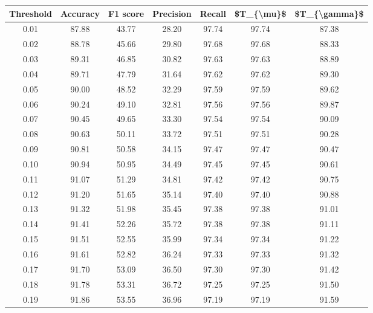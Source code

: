 \begin{tabular}{|c|c|c|c|c|c|c|}
\hline
 Threshold &  Accuracy &  F1 score &  Precision &  Recall &  \$T\_\{\textbackslash mu\}\$ &  \$T\_\{\textbackslash gamma\}\$ \\
\hline
      0.01 &     87.88 &     43.77 &      28.20 &   97.74 &      97.74 &         87.38 \\
      0.02 &     88.78 &     45.66 &      29.80 &   97.68 &      97.68 &         88.33 \\
      0.03 &     89.31 &     46.85 &      30.82 &   97.63 &      97.63 &         88.89 \\
      0.04 &     89.71 &     47.79 &      31.64 &   97.62 &      97.62 &         89.30 \\
      0.05 &     90.00 &     48.52 &      32.29 &   97.59 &      97.59 &         89.62 \\
      0.06 &     90.24 &     49.10 &      32.81 &   97.56 &      97.56 &         89.87 \\
      0.07 &     90.45 &     49.65 &      33.30 &   97.54 &      97.54 &         90.09 \\
      0.08 &     90.63 &     50.11 &      33.72 &   97.51 &      97.51 &         90.28 \\
      0.09 &     90.81 &     50.58 &      34.15 &   97.47 &      97.47 &         90.47 \\
      0.10 &     90.94 &     50.95 &      34.49 &   97.45 &      97.45 &         90.61 \\
      0.11 &     91.07 &     51.29 &      34.81 &   97.42 &      97.42 &         90.75 \\
      0.12 &     91.20 &     51.65 &      35.14 &   97.40 &      97.40 &         90.88 \\
      0.13 &     91.32 &     51.98 &      35.45 &   97.38 &      97.38 &         91.01 \\
      0.14 &     91.41 &     52.26 &      35.72 &   97.38 &      97.38 &         91.11 \\
      0.15 &     91.51 &     52.55 &      35.99 &   97.34 &      97.34 &         91.22 \\
      0.16 &     91.61 &     52.82 &      36.24 &   97.33 &      97.33 &         91.32 \\
      0.17 &     91.70 &     53.09 &      36.50 &   97.30 &      97.30 &         91.42 \\
      0.18 &     91.78 &     53.31 &      36.72 &   97.25 &      97.25 &         91.50 \\
      0.19 &     91.86 &     53.55 &      36.96 &   97.19 &      97.19 &         91.59 \\

\end{tabular}
